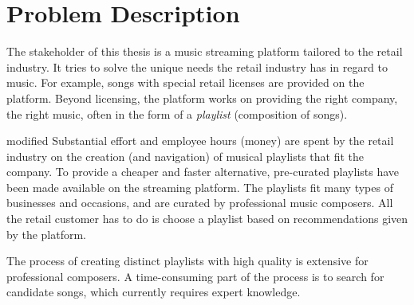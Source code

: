 \documentclass[../report.tex]{subfiles}
\begin{document}
\section{Problem Description}

The stakeholder of this thesis is a music streaming platform tailored to the retail industry. It tries to solve the unique needs the retail industry has in regard to music. For example, songs with special retail licenses are provided on the platform. Beyond licensing, the platform works on providing the right company, the right music, often in the form of a \textit{playlist} (composition of songs).

\begin{color}{modified}
Substantial effort and employee hours (money) are spent by the retail industry on the creation (and navigation) of musical playlists that fit the company. To provide a cheaper and faster alternative, pre-curated playlists have been made available on the streaming platform. The playlists fit many types of businesses and occasions, and are curated by professional music composers. All the retail customer has to do is choose a playlist based on recommendations given by the platform.
\end{color}








The process of creating distinct playlists with high quality is extensive for professional composers. A time-consuming part of the process is to search for candidate songs, which currently requires expert knowledge.
\end{document}
